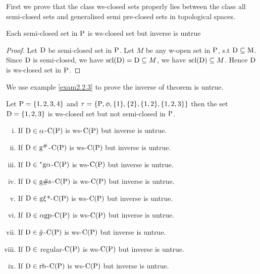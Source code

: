 First we prove that the class ws-closed sets properly lies between the class all semi-closed sets and generalised semi pre-closed sets in topological spaces.

\begin{thm}\label{thm2.2.2}
Each semi-closed set in $\mathrm{P}$ is ws-closed set but inverse is untrue
\end{thm}

\begin{proof}
Let $\mathrm{D}$ be semi-closed set in $\mathrm{P}$. Let $M$ be any w-open set in $\mathrm{P}$, s.t $\mathrm{D}\subseteq \mathrm{M}$. Since $\mathrm{D}$ is semi-closed, we have $\mathrm{scl}(\mathrm{D}) = \mathrm{D} \subseteq M$, we have  $\mathrm{scl}(\mathrm{D}) \subseteq M$.   Hence $\mathrm{D}$ is ws-closed set in $\mathrm{P}$.
\end{proof}

We use example \ref{exam2.2.3} to prove the inverse of  theorem is untrue. 

\begin{exm}\label{exam2.2.3}
Let $\mathrm{P}= \{1, 2, 3, 4\}$ and  $\tau= \{\mathrm{P}, \phi, \{1\}, \{2\},\{1, 2\}, \{1, 2, 3\}\}$ then the set $\mathrm{D}= \{1,2,3\}$ is ws-closed set but not semi-closed in $\mathrm{P}$.  
\end{exm}

\begin{thm}\label{thm2.2.4}
\begin{enumerate}[(i)]
\item If $\mathrm{D}\in\alpha$-$\mathrm{C}(\mathrm{P})$ is ws-$\mathrm{C}(\mathrm{P})$ but inverse is untrue.

\item If $\mathrm{D}\in \mathrm{g}^{\#}$-$\mathrm{C}(\mathrm{P})$ is ws-$\mathrm{C}(\mathrm{P})$ but inverse is untrue.

\item If $\mathrm{D}\in {}^{*}\mathrm{g}\alpha$-$\mathrm{C}(\mathrm{P})$ is ws-$\mathrm{C}(\mathrm{P})$ but inverse is untrue.

\item If $\mathrm{D}\in \mathrm{g}\# \mathrm{s}$-$\mathrm{C}(\mathrm{P})$ is ws-$\mathrm{C}(\mathrm{P})$ but inverse is untrue.

\item If $\mathrm{D}\in \mathrm{g}\xi$*-$\mathrm{C}(\mathrm{P})$ is ws-$\mathrm{C}(\mathrm{P})$ but inverse is untrue.

\item If $\mathrm{D}\in \alpha\mathrm{g}\mathrm{p}$-$\mathrm{C}(\mathrm{P})$ is ws-$\mathrm{C}(\mathrm{P})$ but inverse is untrue.

\item If $\mathrm{D}\in \ddot{g}$-$\mathrm{C}(\mathrm{P})$ is ws-$\mathrm{C}(\mathrm{P})$ but inverse is untrue.

\item If $\mathrm{D}\in$ regular-$\mathrm{C}(\mathrm{P})$ is ws-$\mathrm{C}(\mathrm{P})$ but inverse is untrue.

\item If $\mathrm{D}\in \mathrm{r}\mathrm{b}$-$\mathrm{C}(\mathrm{P})$ is ws-$\mathrm{C}(\mathrm{P})$ but inverse is untrue.
\end{enumerate}
\end{thm}

